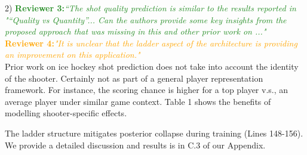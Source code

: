 \documentclass{article}
\newcommand{\system}{VaRLAE\;}
\begin{document}
2) \textcolor{ForestGreen}{\bf Reviewer 3:}\textcolor{ForestGreen}{\it “The shot quality prediction is similar to the results reported in "“Quality vs Quantity”... Can the authors provide some key insights from the proposed approach that was missing in this and other prior work on ..."}\\
\textcolor{orange}{\bf Reviewer 4:}\textcolor{orange}{\it "It is unclear that the ladder aspect of the architecture is providing an improvement on this application."}\\
Prior work on ice hockey shot prediction does not take into account the identity of the shooter. Certainly not as part of a general player representation framework.
For instance, the scoring chance is higher for a top player v.s., an average player under similar game context. Table 1 shows the benefits of modelling shooter-specific effects.

The ladder structure mitigates posterior collapse during training (Lines 148-156). We provide a detailed discussion and results is in C.3 of our Appendix. 
\end{document}
